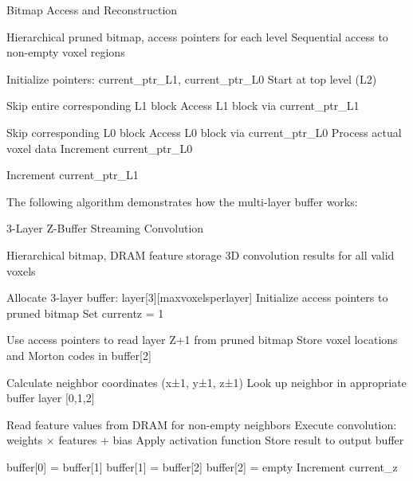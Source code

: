 \documentclass[sigconf, screen]{acmart}
\begin{document}
\begin{algorithm}[H]
\caption{Bitmap Access and Reconstruction}
\begin{algorithmic}
\REQUIRE Hierarchical pruned bitmap, access pointers for each level
\ENSURE Sequential access to non-empty voxel regions

\STATE Initialize pointers: current\_ptr\_L1, current\_ptr\_L0
\STATE Start at top level (L2)

        \STATE Skip entire corresponding L1 block
    \ELSE
        \STATE Access L1 block via current\_ptr\_L1
        
                \STATE Skip corresponding L0 block
            \ELSE
                \STATE Access L0 block via current\_ptr\_L0
                \STATE Process actual voxel data
                \STATE Increment current\_ptr\_L0
            \ENDIF
        \ENDFOR
        
        \STATE Increment current\_ptr\_L1
    \ENDIF
\ENDFOR
\end{algorithmic}
\end{algorithm}
The following algorithm demonstrates how the multi-layer buffer works:
\begin{algorithm}[H]
\caption{3-Layer Z-Buffer Streaming Convolution}
\begin{algorithmic}
\REQUIRE Hierarchical bitmap, DRAM feature storage
\ENSURE 3D convolution results for all valid voxels

\STATE Allocate 3-layer buffer: layer[3][maxvoxelsperlayer]
\STATE Initialize access pointers to pruned bitmap
\STATE Set currentz = 1


\STATE Use access pointers to read layer Z+1 from pruned bitmap
\STATE Store voxel locations and Morton codes in buffer[2]


      \STATE Calculate neighbor coordinates (x±1, y±1, z±1)
      \STATE Look up neighbor in appropriate buffer layer [0,1,2]
  \ENDFOR

  \STATE Read feature values from DRAM for non-empty neighbors
  \STATE Execute convolution: weights × features + bias
  \STATE Apply activation function
  \STATE Store result to output buffer

\ENDFOR

\STATE buffer[0] = buffer[1]
\STATE buffer[1] = buffer[2]
\STATE buffer[2] = empty
\STATE Increment current\_z
\ENDFOR
\end{algorithmic}
\end{algorithm}
\end{document}
